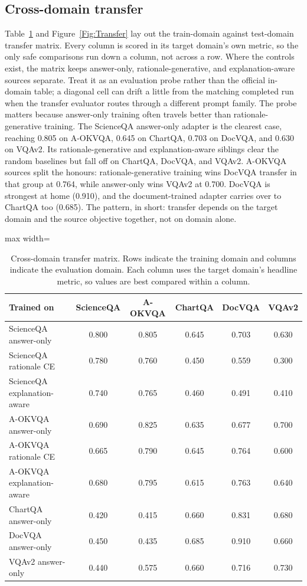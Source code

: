 \documentclass[preprint,12pt]{elsarticle}
\begin{document}
\subsection{Cross-domain transfer}
Table~\ref{tab:transfer} and Figure~\ref{Fig:Transfer} lay out the train-domain against test-domain transfer matrix.
Every column is scored in its target domain's own metric, so the only safe comparisons run down a column, not across a row.
Where the controls exist, the matrix keeps answer-only, rationale-generative, and explanation-aware sources separate.
Treat it as an evaluation probe rather than the official in-domain table; a diagonal cell can drift a little from the matching completed run when the transfer evaluator routes through a different prompt family.
The probe matters because answer-only training often travels better than rationale-generative training.
The ScienceQA answer-only adapter is the clearest case, reaching 0.805 on A-OKVQA, 0.645 on ChartQA, 0.703 on DocVQA, and 0.630 on VQAv2.
Its rationale-generative and explanation-aware siblings clear the random baselines but fall off on ChartQA, DocVQA, and VQAv2.
A-OKVQA sources split the honours: rationale-generative training wins DocVQA transfer in that group at 0.764, while answer-only wins VQAv2 at 0.700.
DocVQA is strongest at home (0.910), and the document-trained adapter carries over to ChartQA too (0.685).
The pattern, in short: transfer depends on the target domain and the source objective together, not on domain alone.

\begin{table}[!ht]
\centering
\caption{Cross-domain transfer matrix. Rows indicate the training domain and columns indicate the evaluation domain. Each column uses the target domain's headline metric, so values are best compared within a column.}
\label{tab:transfer}
\scriptsize
\begin{adjustbox}{max width=\textwidth}
\begin{tabular}{|l|ccccc|}
\hline
\textbf{Trained on} & \textbf{ScienceQA} & \textbf{A-OKVQA} & \textbf{ChartQA} & \textbf{DocVQA} & \textbf{VQAv2} \\ \hline
ScienceQA answer-only & 0.800 & 0.805 & 0.645 & 0.703 & 0.630 \\
ScienceQA rationale CE & 0.780 & 0.760 & 0.450 & 0.559 & 0.300 \\
ScienceQA explanation-aware & 0.740 & 0.765 & 0.460 & 0.491 & 0.410 \\
A-OKVQA answer-only & 0.690 & 0.825 & 0.635 & 0.677 & 0.700 \\
A-OKVQA rationale CE & 0.665 & 0.790 & 0.645 & 0.764 & 0.600 \\
A-OKVQA explanation-aware & 0.680 & 0.795 & 0.615 & 0.763 & 0.640 \\
ChartQA answer-only & 0.420 & 0.415 & 0.660 & 0.831 & 0.680 \\
DocVQA answer-only & 0.450 & 0.435 & 0.685 & 0.910 & 0.660 \\
VQAv2 answer-only & 0.440 & 0.575 & 0.660 & 0.716 & 0.730 \\ \hline
\end{tabular}
\end{adjustbox}
\end{table}
\end{document}
